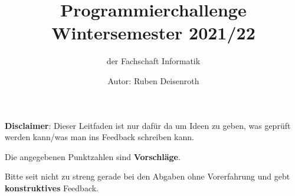 \documentclass[ngerman,accentcolor=3c,colorbacktitle,12pt,T1,points=true, RGB]{tudaexercise}
\begin{document}
\title{Programmierchallenge Wintersemester 2021/22}
\subtitle{der Fachschaft Informatik}
\author{Autor: Ruben Deisenroth}
\maketitle
\begin{tcolorbox}[
        colback=\IfDarkModeTF{accentcolor!20!\thepagecolor}{accentcolor!10!\thepagecolor}, %
        coltext=.,
        colframe=gray, %
        frame hidden,
        title style=accentcolor,
        arc=3pt,
        boxrule=0pt,
        left=5pt, %
        enhanced, %
        fonttitle=\sffamily, %
        overlay={ %
            \begin{tcbclipinterior}%
                \fill[TUDa-3c] (frame.south west) rectangle ([xshift=4pt]frame.north west); %
            \end{tcbclipinterior}%
        }]
    \textbf{\textsf{Disclaimer}}: Dieser Leitfaden ist nur dafür da um Ideen zu geben, was geprüft werden kann/was man ins Feedback schreiben kann.

    Die angegebenen Punktzahlen sind \textbf{Vorschläge}.
\end{tcolorbox}
Bitte seit nicht zu streng gerade bei den Abgaben ohne Vorerfahrung und gebt \textbf{konstruktives} Feedback.
\end{document}
